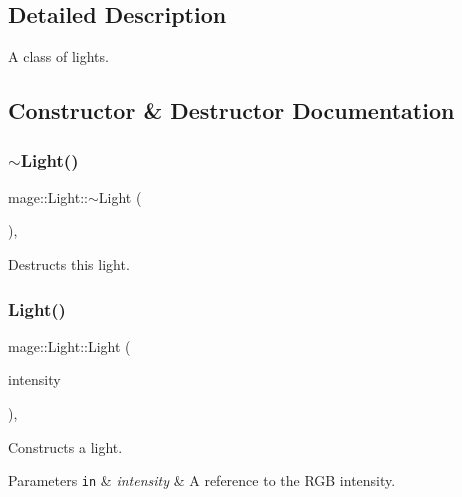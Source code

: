 \subsection{Detailed Description}
A class of lights. 

\subsection{Constructor \& Destructor Documentation}
\hypertarget{classmage_1_1_light_af877bc473dede83689a4bda8a36d4d36}{}\label{classmage_1_1_light_af877bc473dede83689a4bda8a36d4d36} 
\subsubsection{\texorpdfstring{$\sim$\+Light()}{~Light()}}
{\footnotesize\ttfamily mage\+::\+Light\+::$\sim$\+Light (\begin{DoxyParamCaption}{ }\end{DoxyParamCaption})\hspace{0.3cm}{\ttfamily [virtual]}, {\ttfamily [default]}}

Destructs this light. \hypertarget{classmage_1_1_light_ab470ad4bde2c1e27068541bb53accb0c}{}\label{classmage_1_1_light_ab470ad4bde2c1e27068541bb53accb0c} 
\subsubsection{\texorpdfstring{Light()}{Light()}\hspace{0.1cm}{\footnotesize\ttfamily [1/4]}}
{\footnotesize\ttfamily mage\+::\+Light\+::\+Light (\begin{DoxyParamCaption}\item[{const \hyperlink{structmage_1_1_r_g_b_spectrum}{R\+G\+B\+Spectrum} \&}]{intensity }\end{DoxyParamCaption})\hspace{0.3cm}{\ttfamily [explicit]}, {\ttfamily [protected]}}

Constructs a light.


\begin{DoxyParams}[1]{Parameters}
\mbox{\tt in}  & {\em intensity} & A reference to the R\+GB intensity. \\
\hline
\end{DoxyParams}
\hypertarget{classmage_1_1_light_aae4b7899b7709f658d0d061909e45cec}{}\label{classmage_1_1_light_aae4b7899b7709f658d0d061909e45cec} 
